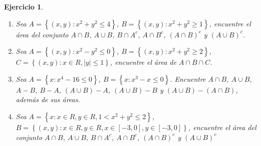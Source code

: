 \documentclass[12pt,twoside]{article}
\newtheorem{Ejer}{Ejercicio}
\begin{document}
\begin{Ejer}
\begin{enumerate}
\item Sea $A=\left\{\left(x,y\right): x^2+y^2\leq4\right\}$, $B=\left\{\left(x,y\right): x^2+y^2\geq1\right\}$, encuentre el \'area del conjunto $A\cap B$, $A\cup B$, $B\cap A^{c}$, $A\cap B^{c}$, $\left(A\cap B\right)^{c}$ y $\left(A\cup B\right)^{c}$.

\item Sea $A=\left\{\left(x,y\right): x^2-y^2\leq0\right\}$, $B=\left\{\left(x,y\right): x^2+y^2\geq2\right\}$,  $C=\left\{\left(x,y\right):x\in R, |y|\leq1\right\}$, encuentre el \'area de $A\cap B\cap C$.

\item Sea $A=\left\{x:x^4-16\leq0\right\}$, $B=\left\{x:x^3-x\leq0\right\}$. Encuentre $A\cap B$, $A\cup B$, $A-B$, $B-A$, $\left(A\cup B\right)-A$, $\left(A\cup B\right)-B$ y $\left(A\cup B\right)-\left(A\cap B\right)$, adem\'as de sus \'areas.

\item Sea $A=\left\{x:x\in R, y\in R, 1<x^{2}+y^{2}\leq2\right\}$, $B=\left\{(x,y):x\in R, y\in R, x\in\left[-3,0\right], y\in\left[-3,0\right]\right\}$, encuentre el \'area del conjunto $A\cap B$, $A\cup B$, $B\cap A^{c}$, $A\cap B^{c}$, $\left(A\cap B\right)^{c}$ y $\left(A\cup B\right)^{c}$
\end{enumerate}
\end{Ejer}
\end{document}
